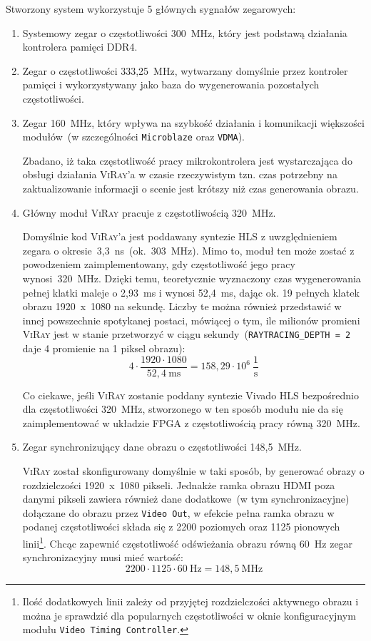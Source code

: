 Stworzony system wykorzystuje 5 głównych sygnałów zegarowych:
\begin{enumerate}
\item Systemowy zegar o częstotliwości 300~MHz, który jest podstawą działania kontrolera pamięci DDR4.
\item Zegar o częstotliwości 333,25~MHz, wytwarzany domyślnie przez kontroler pamięci i wykorzystywany jako baza do wygenerowania pozostałych częstotliwości.
\item Zegar 160~MHz, który wpływa na szybkość działania i komunikacji większości modułów~(w szczególności \texttt{Microblaze} oraz \texttt{VDMA}). 

Zbadano, iż taka częstotliwość pracy mikrokontrolera jest wystarczająca do obsługi działania \textsc{ViRay}'a w czasie rzeczywistym tzn. czas potrzebny na zaktualizowanie informacji o scenie jest krótszy niż czas generowania obrazu.

\item Główny moduł \textsc{ViRay} pracuje z częstotliwością 320~MHz.

Domyślnie kod \textsc{ViRay}'a jest poddawany syntezie HLS z uwzględnieniem zegara o okresie~3,3~ns~(ok.~303~MHz). Mimo to, moduł ten może zostać z powodzeniem zaimplementowany, gdy częstotliwość jego pracy wynosi~320~MHz. Dzięki temu, teoretycznie wyznaczony czas wygenerowania pełnej klatki maleje o 2,93~ms i wynosi 52,4~ms, dając ok. 19 pełnych klatek obrazu 1920~x~1080 na sekundę. Liczby te można również przedstawić w innej powszechnie spotykanej postaci, mówiącej o tym, ile milionów promieni \textsc{ViRay} jest w stanie przetworzyć w ciągu sekundy~(\texttt{RAYTRACING\_DEPTH = 2} daje 4 promienie na 1 piksel obrazu):
\begin{equation}
4\cdot\frac{1920\cdot 1080}{52,4~\mathrm{ms}}=158,29\cdot 10^6\ \mathrm{\frac{1}{s}}
\end{equation}

Co ciekawe, jeśli \textsc{ViRay} zostanie poddany syntezie Vivado HLS bezpośrednio dla częstotliwości 320~MHz, stworzonego w ten sposób modułu nie da się zaimplementować w układzie FPGA z częstotliwością pracy równą 320~MHz.

\item Zegar synchronizujący dane obrazu o częstotliwości 148,5~MHz.

\textsc{ViRay} został skonfigurowany domyślnie w taki sposób, by generować obrazy o rozdzielczości 1920~x~1080 pikseli. Jednakże ramka obrazu HDMI poza danymi pikseli zawiera również dane dodatkowe~(w tym synchronizacyjne) dołączane do obrazu przez \texttt{Video Out}, w efekcie pełna ramka obrazu w podanej częstotliwości składa się z 2200 poziomych oraz 1125 pionowych linii\footnote{Ilość dodatkowych linii zależy od przyjętej rozdzielczości aktywnego obrazu i można je sprawdzić dla popularnych częstotliwości w oknie konfiguracyjnym modułu \texttt{Video Timing Controller}.}. Chcąc zapewnić częstotliwość odświeżania obrazu równą 60~Hz zegar synchronizacyjny musi mieć wartość:
\begin{equation*}
2200\cdot 1125\cdot 60\ \mathrm{Hz} = 148,5\ \mathrm{MHz}
\end{equation*}
\end{enumerate}

